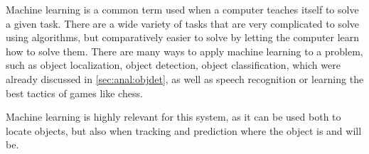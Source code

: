 Machine learning is a common term used when a computer teaches itself to solve a given task\cite{ArtificialIntelligencealanpoole}.
There are a wide variety of tasks that are very complicated to solve using algorithms, but comparatively easier to solve by letting the computer learn how to solve them. 
There are many ways to apply machine learning to a problem, such as object localization, object detection, object classification, which were already discussed in \autoref{sec:anal:objdet}, as well as speech recognition or learning the best tactics of games like chess.

Machine learning is highly relevant for this system, as it can be used both to locate objects, but also when tracking and prediction where the object is and will be.

